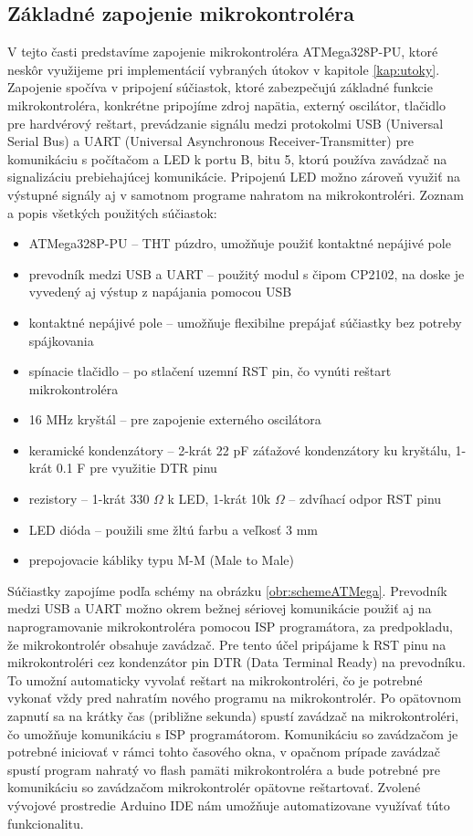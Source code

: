 \subsection{Základné zapojenie mikrokontroléra}
V tejto časti predstavíme zapojenie mikrokontroléra ATMega328P-PU, ktoré neskôr využijeme pri implementácií vybraných útokov v kapitole \ref{kap:utoky}. Zapojenie spočíva v pripojení súčiastok, ktoré zabezpečujú základné funkcie mikrokontroléra, konkrétne pripojíme zdroj napätia, externý oscilátor, tlačidlo pre hardvérový reštart, prevádzanie signálu medzi protokolmi USB (Universal Serial Bus) a UART (Universal Asynchronous Receiver-Transmitter) pre komunikáciu s počítačom a LED k portu B, bitu 5, ktorú používa zavádzač na signalizáciu prebiehajúcej komunikácie. Pripojenú LED možno zároveň využiť na výstupné signály aj v samotnom programe nahratom na mikrokontroléri. Zoznam a popis všetkých použitých súčiastok:
\begin{itemize}
    \item ATMega328P-PU -- THT púzdro, umožňuje použiť kontaktné nepájivé pole
    \item prevodník medzi USB a UART -- použitý modul s čipom CP2102, na doske je vyvedený aj výstup z napájania pomocou USB
    \item kontaktné nepájivé pole -- umožňuje flexibilne prepájať súčiastky bez potreby spájkovania
    \item spínacie tlačidlo -- po stlačení uzemní RST pin, čo vynúti reštart mikrokontroléra
    \item 16 MHz kryštál -- pre zapojenie externého oscilátora
    \item keramické kondenzátory -- 2-krát 22 pF záťažové kondenzátory ku kryštálu, 1-krát 0.1 \textmu F pre využitie DTR pinu
    \item rezistory -- 1-krát 330 $\Omega$ k LED, 1-krát 10k $\Omega$ -- zdvíhací odpor RST pinu
    \item LED dióda -- použili sme žltú farbu a veľkosť 3 mm
    \item prepojovacie kábliky typu M-M (Male to Male)
\end{itemize}
Súčiastky zapojíme podľa schémy na obrázku \ref{obr:schemeATMega}. Prevodník medzi USB a UART možno okrem bežnej sériovej komunikácie použiť aj na naprogramovanie mikrokontroléra pomocou ISP programátora, za predpokladu, že mikrokontrolér obsahuje zavádzač. Pre tento účel pripájame k RST pinu na mikrokontroléri cez kondenzátor pin DTR (Data Terminal Ready) na prevodníku. To umožní automaticky vyvolať reštart na mikrokontroléri, čo je potrebné vykonať vždy pred nahratím nového programu na mikrokontrolér. Po opätovnom zapnutí sa na krátky čas (približne sekunda) spustí zavádzač na mikrokontroléri, čo umožňuje komunikáciu s ISP programátorom. Komunikáciu so zavádzačom je potrebné iniciovať v rámci tohto časového okna, v opačnom prípade zavádzač spustí program nahratý vo flash pamäti mikrokontroléra a bude potrebné pre komunikáciu so zavádzačom mikrokontrolér opätovne reštartovať. Zvolené vývojové prostredie Arduino IDE nám umožňuje automatizovane využívať túto funkcionalitu.

